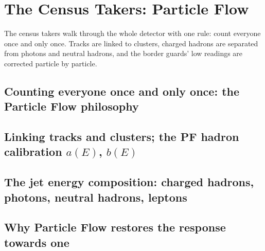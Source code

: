 \chapter{The Census Takers: Particle Flow}
\label{ch:census_takers}

\begin{journeybox}
The census takers walk through the whole detector with one rule: count everyone
once and only once. Tracks are linked to clusters, charged hadrons are separated
from photons and neutral hadrons, and the border guards' low readings are
corrected particle by particle.
\end{journeybox}


\section{Counting everyone once and only once: the Particle Flow philosophy}
\label{sec:census_takers:counting_everyone_once_and_only_once_the}

\section{Linking tracks and clusters; the PF hadron calibration $a(E)$, $b(E)$}
\label{sec:census_takers:linking_tracks_and_clusters_the_pf_hadro}

\section{The jet energy composition: charged hadrons, photons, neutral hadrons, leptons}
\label{sec:census_takers:the_jet_energy_composition_charged_hadro}

\section{Why Particle Flow restores the response towards one}
\label{sec:census_takers:why_particle_flow_restores_the_response_}

